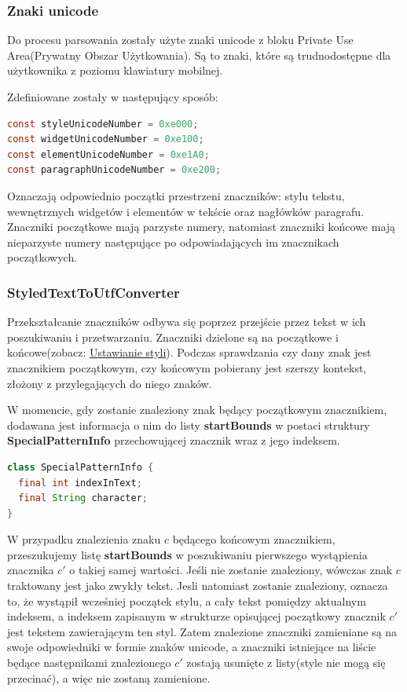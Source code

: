\subsubsection{Znaki unicode}

Do procesu parsowania zostały użyte znaki unicode z bloku Private Use Area(Prywatny Obszar Użytkowania). Są to znaki, które są trudnodostępne dla użytkownika z poziomu klawiatury mobilnej.

\noindent Zdefiniowane zostały w następujący sposób:

\begin{lstlisting}[language=java]
const styleUnicodeNumber = 0xe000;
const widgetUnicodeNumber = 0xe100;
const elementUnicodeNumber = 0xe1A0;
const paragraphUnicodeNumber = 0xe200;
\end{lstlisting}

Oznaczają odpowiednio początki przestrzeni znaczników: stylu tekstu, wewnętrznych widgetów i elementów w tekście oraz nagłówków paragrafu.
Znaczniki początkowe mają parzyste numery, natomiast znaczniki końcowe mają nieparzyste numery następujące po odpowiadających im znacznikach początkowych.

\subsubsection{StyledTextToUtfConverter}

Przekształcanie znaczników odbywa się poprzez przejście przez tekst w ich poszukiwaniu i przetwarzaniu. Znaczniki dzielone są na początkowe i końcowe(zobacz: \hyperref[subsec:ustawianieStyli]{Ustawianie styli}). Podczas sprawdzania czy dany znak jest znacznikiem początkowym, czy końcowym pobierany jest szerszy kontekst, złożony z przylegających do niego znaków.

W momencie, gdy zostanie znaleziony znak będący początkowym znacznikiem, dodawana jest informacja o nim do listy \textbf{startBounds} w postaci struktury \textbf{SpecialPatternInfo} przechowującej znacznik wraz z jego indeksem.

\begin{lstlisting}[language=Java]
class SpecialPatternInfo {
  final int indexInText;
  final String character;
}
\end{lstlisting}

W przypadku znalezienia znaku $c$ będącego końcowym znacznikiem, przeszukujemy listę \textbf{startBounds} w poszukiwaniu pierwszego wystąpienia znacznika $c'$ o takiej samej wartości. Jeśli nie zostanie znaleziony, wówczas znak $c$ traktowany jest jako zwykły tekst. Jesli natomiast zostanie znaleziony, oznacza to, że wystąpił wcześniej początek stylu, a cały tekst pomiędzy aktualnym indeksem, a indeksem zapisanym w strukturze opisującej początkowy znacznik $c'$ jest tekstem zawierającym ten styl. Zatem znalezione znaczniki zamieniane są na swoje odpowiedniki w formie znaków unicode, a znaczniki istniejące na liście będące następnikami znalezionego $c'$ zostają usunięte z listy(style nie mogą się przecinać), a więc nie zostaną zamienione.

